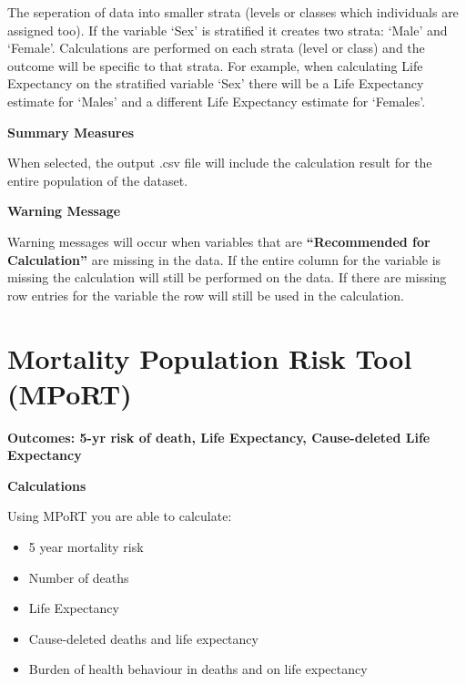 \documentclass[]{book}
\providecommand{\tightlist}{%
  \setlength{\itemsep}{0pt}\setlength{\parskip}{0pt}}
\begin{document}
The seperation of data into smaller strata (levels or
classes which individuals are assigned too). If the variable `Sex' is
stratified it creates two strata: `Male' and `Female'. Calculations are
performed on each strata (level or class) and the outcome will be
specific to that strata. For example, when calculating Life Expectancy
on the stratified variable `Sex' there will be a Life Expectancy
estimate for `Males' and a different Life Expectancy estimate for
`Females'.

\textbf{Summary Measures}

When selected, the output .csv file will include the calculation result
for the entire population of the dataset.

\textbf{Warning Message}

Warning messages will occur when variables that are
\textbf{``Recommended for Calculation''} are missing in the data. If the
entire column for the variable is missing the calculation will still be
performed on the data. If there are missing row entries for the variable
the row will still be used in the calculation.

























\appendix


\chapter{Mortality Population Risk Tool
(MPoRT)}\label{mortality-population-risk-tool-mport}

\textbf{Outcomes: 5-yr risk of death, Life Expectancy, Cause-deleted
Life Expectancy}

\textbf{Calculations}

Using MPoRT you are able to calculate:

\begin{itemize}
\tightlist
\item
  5 year mortality risk
\item
  Number of deaths
\item
  Life Expectancy
\item
  Cause-deleted deaths and life expectancy
\item
  Burden of health behaviour in deaths and on life expectancy
\end{itemize}
\end{document}
